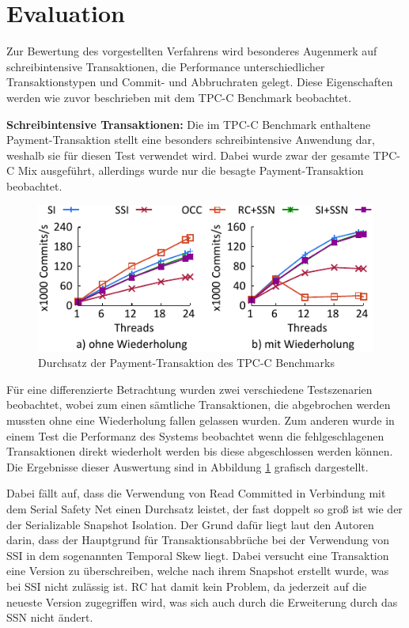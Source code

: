 \section{Evaluation}
\label{sec:evaluation}

Zur Bewertung des vorgestellten Verfahrens wird besonderes Augenmerk auf schreibintensive Transaktionen, die Performance unterschiedlicher Transaktionstypen und Commit- und Abbruchraten gelegt.
Diese Eigenschaften werden wie zuvor beschrieben mit dem TPC-C Benchmark beobachtet.

\textbf{Schreibintensive Transaktionen:} Die im TPC-C Benchmark enthaltene Payment-Transaktion stellt eine besonders schreibintensive Anwendung dar, weshalb sie für diesen Test verwendet wird.
Dabei wurde zwar der gesamte TPC-C Mix ausgeführt, allerdings wurde nur die besagte Payment-Transaktion beobachtet.

\begin{figure}
	\includegraphics[width=\columnwidth]{img/Figure_3.pdf}
	\caption{Durchsatz der Payment-Transaktion des TPC-C Benchmarks}
	\label{fig:payment}
\end{figure}

Für eine differenzierte Betrachtung wurden zwei verschiedene Testszenarien beobachtet, wobei zum einen sämtliche Transaktionen, die abgebrochen werden mussten ohne eine Wiederholung fallen gelassen wurden.
Zum anderen wurde in einem Test die Performanz des Systems beobachtet wenn die fehlgeschlagenen Transaktionen direkt wiederholt werden bis diese abgeschlossen werden können.
Die Ergebnisse dieser Auswertung sind in Abbildung \ref{fig:payment} grafisch dargestellt.

Dabei fällt auf, dass die Verwendung von Read Committed in Verbindung mit dem Serial Safety Net einen Durchsatz leistet, der fast doppelt so groß ist wie der der Serializable Snapshot Isolation.
Der Grund dafür liegt laut den Autoren darin, dass der Hauptgrund für Transaktionsabbrüche bei der Verwendung von SSI in dem sogenannten Temporal Skew liegt.
Dabei versucht eine Transaktion eine Version zu überschreiben, welche nach ihrem Snapshot erstellt wurde, was bei SSI nicht zulässig ist.
RC hat damit kein Problem, da jederzeit auf die neueste Version zugegriffen wird, was sich auch durch die Erweiterung durch das SSN nicht ändert.

